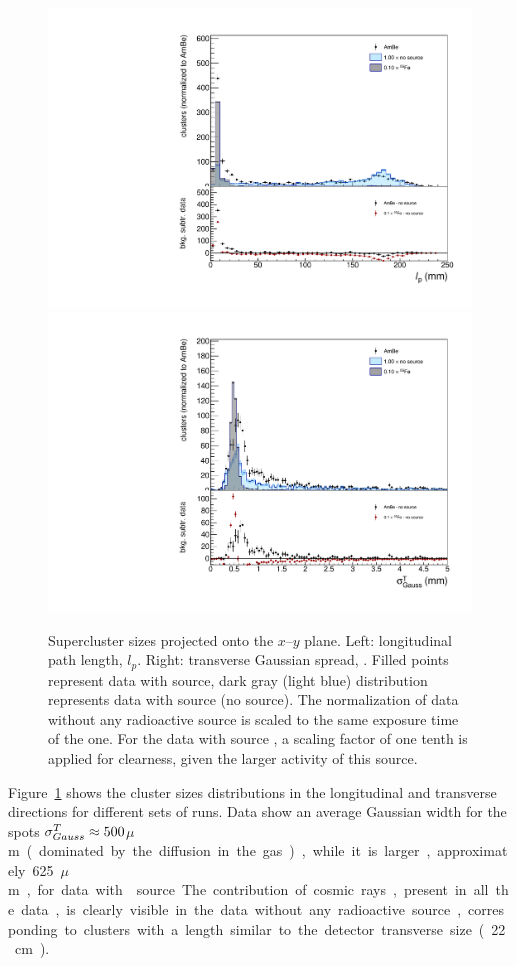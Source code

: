 \begin{figure}[ht]
  \begin{center}
  \includegraphics[width=0.45\linewidth]{figures/length}
  \includegraphics[width=0.45\linewidth]{figures/tgausssigma}

  \caption{Supercluster sizes projected onto the $x$--$y$ plane. Left:
    longitudinal path length, $l_p$.  Right: transverse Gaussian
    spread, \tsigmag. Filled points represent data with \ambe source,
    dark gray (light blue) distribution represents data with \fe
    source (no source).  The normalization of data without any
    radioactive source is scaled to the same exposure time of
    the \ambe one. For the data with \fe source , a scaling factor of
    one tenth is applied for clearness, given the larger activity of
    this source.  \label{fig:clsize}}

    \end{center}
\end{figure}

Figure~\ref{fig:clsize} shows the cluster sizes distributions in the
longitudinal and transverse directions for different sets of
runs. Data show an average Gaussian width for the \fe spots
$\sigma^T_{Gauss}\approx500$\unit{$\mu$m} (dominated by the diffusion in the
gas), while it is larger, approximately 625\unit{$\mu$m}, for data
with \ambe source.  The contribution of cosmic rays, present in all
the data, is clearly visible in the data without any radioactive
source, corresponding to clusters with a length similar to the
detector transverse size (22\unit{cm}).

